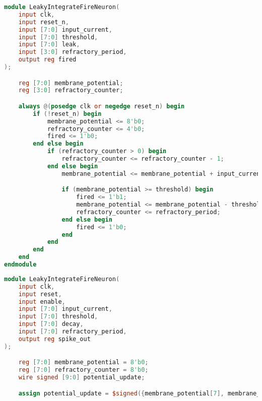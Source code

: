 \begin{table*}[!htbp]
\centering
\caption{Leaky Integrate-and-Fire Spiking Neuron Verilog Module generated by ChatGPT}
\label{table:LIF_module}
\begin{minipage}[t]{.49\textwidth}
\begin{lstlisting}[language=Verilog, caption={Initial Module}]
module LeakyIntegrateFireNeuron(
    input clk,
    input reset_n,
    input [7:0] input_current,
    input [7:0] threshold,
    input [7:0] leak,
    input [3:0] refractory_period,
    output reg fired
);

    reg [7:0] membrane_potential;
    reg [3:0] refractory_counter;

    always @(posedge clk or negedge reset_n) begin
        if (!reset_n) begin
            membrane_potential <= 8'b0;
            refractory_counter <= 4'b0;
            fired <= 1'b0;
        end else begin
            if (refractory_counter > 0) begin
                refractory_counter <= refractory_counter - 1;
            end else begin
                membrane_potential <= membrane_potential + input_current - (membrane_potential * leak >> 8);

                if (membrane_potential >= threshold) begin
                    fired <= 1'b1;
                    membrane_potential <= membrane_potential - threshold;
                    refractory_counter <= refractory_period;
                end else begin
                    fired <= 1'b0;
                end
            end
        end
    end
endmodule
\end{lstlisting}
\end{minipage}
\hfill
\begin{minipage}[t]{.49\textwidth}
\begin{lstlisting}[language=Verilog, caption={Final Module}]
module LeakyIntegrateFireNeuron(
    input clk,
    input reset,
    input enable,
    input [7:0] input_current,
    input [7:0] threshold,
    input [7:0] decay,
    input [7:0] refractory_period,
    output reg spike_out
);

    reg [7:0] membrane_potential = 8'b0;
    reg [7:0] refractory_counter = 8'b0;
    wire signed [9:0] potential_update;

    assign potential_update = $signed({membrane_potential[7], membrane_potential[7], membrane_potential}) +$signed({input_current[7], input_current[7], input_current}) +(membrane_potential[7] ? $signed({decay[7], decay[7], decay}) : -$signed({decay[7], decay[7], decay}));


\end{lstlisting}
\end{minipage}
\end{table*}
